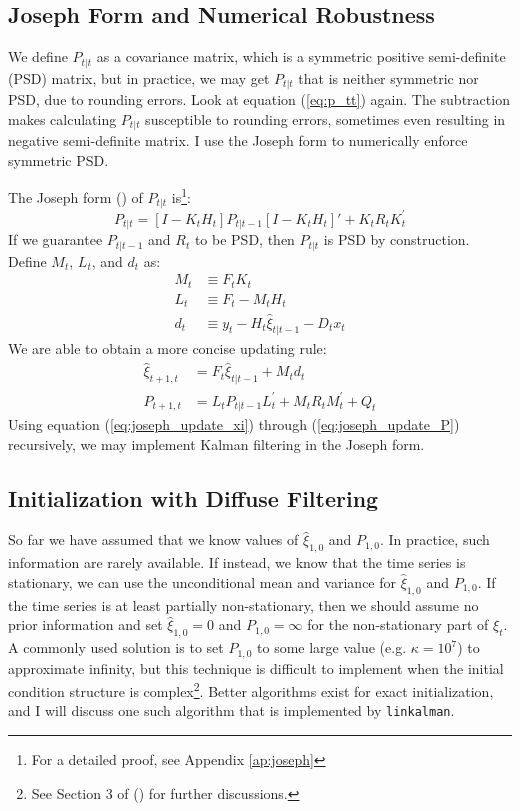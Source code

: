 \documentclass[12pt]{article}
\numberwithin{equation}{section}
\begin{document}
\subsection{Joseph Form and Numerical Robustness}
We define $P_{t|t}$ as a covariance matrix, which is a symmetric positive semi-definite (PSD) matrix, but in practice, we may get $P_{t|t}$ that is neither symmetric nor PSD, due to rounding errors. Look at equation (\ref{eq:p_tt}) again. The subtraction makes calculating $P_{t|t}$ susceptible to rounding errors, sometimes even resulting in negative semi-definite matrix. I use the Joseph form to numerically enforce symmetric PSD. 

The Joseph form (\cite{joseph_1968}) of $P_{t|t}$ is\footnote{For a detailed proof, see Appendix \ref{ap:joseph}}:
\[
    P_{t|t} = [I - K_tH_t]P_{t|t-1}[I - K_tH_t]' + K_tR_tK_t^{'}    
\]
If we guarantee $P_{t|t-1}$ and $R_t$ to be PSD, then $P_{t|t}$ is PSD by construction. Define $M_t$, $L_t$, and $d_t$ as:
\begin{align*}
    M_t &\equiv F_tK_t \\
    L_t &\equiv F_t-M_tH_t \\
    d_t &\equiv y_t - H_t\hat{\xi}_{t|t-1} - D_tx_t
\end{align*}
We are able to obtain a more concise updating rule:
\begin{align}
    \hat{\xi}_{t+1,t} &= F_t\hat{\xi}_{t|t-1} + M_td_t \label{eq:joseph_update_xi} \\
    P_{t+1,t} &= L_tP_{t|t-1}L_t^{'} + M_tR_tM_t^{'} + Q_t \label{eq:joseph_update_P}
\end{align}
Using equation (\ref{eq:joseph_update_xi}) through (\ref{eq:joseph_update_P}) recursively, we may implement Kalman filtering in the Joseph form. 

\subsection{Initialization with Diffuse Filtering} \label{subsec:diff_filter}
So far we have assumed that we know values of $\hat{\xi}_{1,0}$ and $P_{1,0}$. In practice, such information are rarely available. If instead, we know that the time series is stationary, we can use the unconditional mean and variance for $\hat{\xi}_{1,0}$ and $P_{1,0}$. If the time series is at least partially non-stationary, then we should assume no prior information and set $\hat{\xi}_{1,0}=0$ and $P_{1,0}=\infty$ for the non-stationary part of $\xi_t$. A commonly used solution is to set $P_{1,0}$ to some large value (e.g. $\kappa=10^7$) to approximate infinity, but this technique is difficult to implement when the initial condition structure is complex\footnote{See Section 3 of (\cite{doan_2010}) for further discussions.}. Better algorithms exist for exact initialization, and I will discuss one such algorithm that is implemented by \texttt{linkalman}.
\end{document}
